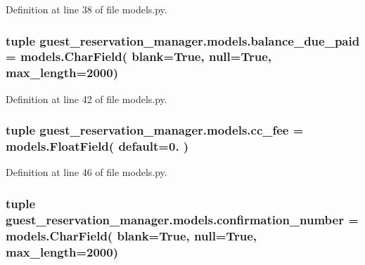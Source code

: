 Definition at line 38 of file models.\-py.

\hypertarget{namespaceguest__reservation__manager_1_1models_a194b94d8c28faf0fbe5e6844c2e1c5e3}{
\subsubsection[{balance\-\_\-due\-\_\-paid}]{\setlength{\rightskip}{0pt plus 5cm}tuple guest\-\_\-reservation\-\_\-manager.\-models.\-balance\-\_\-due\-\_\-paid = models.\-Char\-Field( blank=True, null=True, max\-\_\-length=2000)}}\label{namespaceguest__reservation__manager_1_1models_a194b94d8c28faf0fbe5e6844c2e1c5e3}


Definition at line 42 of file models.\-py.

\hypertarget{namespaceguest__reservation__manager_1_1models_af437f3cc8a5d025cf3c2f2aca573ac86}{
\subsubsection[{cc\-\_\-fee}]{\setlength{\rightskip}{0pt plus 5cm}tuple guest\-\_\-reservation\-\_\-manager.\-models.\-cc\-\_\-fee = models.\-Float\-Field( default=0. )}}\label{namespaceguest__reservation__manager_1_1models_af437f3cc8a5d025cf3c2f2aca573ac86}


Definition at line 46 of file models.\-py.

\hypertarget{namespaceguest__reservation__manager_1_1models_ac10b02fe74f7251e88135c97ed860dfd}{
\subsubsection[{confirmation\-\_\-number}]{\setlength{\rightskip}{0pt plus 5cm}tuple guest\-\_\-reservation\-\_\-manager.\-models.\-confirmation\-\_\-number = models.\-Char\-Field( blank=True, null=True, max\-\_\-length=2000)}}\label{namespaceguest__reservation__manager_1_1models_ac10b02fe74f7251e88135c97ed860dfd}


